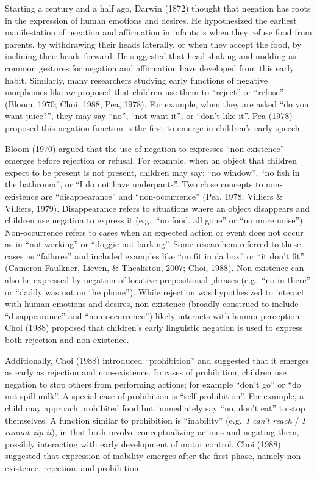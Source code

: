 \documentclass[10pt, letterpaper]{article}
\begin{document}
Starting a century and a half ago, Darwin (1872) thought that negation
has roots in the expression of human emotions and desires. He
hypothesized the earliest manifestation of negation and affirmation in
infants is when they refuse food from parents, by withdrawing their
heads laterally, or when they accept the food, by inclining their heads
forward. He suggested that head shaking and nodding as common gestures
for negation and affirmation have developed from this early habit.
Similarly, many researchers studying early functions of negative
morphemes like \emph{no} proposed that children use them to ``reject''
or ``refuse'' (Bloom, 1970; Choi, 1988; Pea, 1978). For example, when
they are asked ``do you want juice?'', they may say ``no'', ``not want
it'', or ``don't like it''. Pea (1978) proposed this negation function
is the first to emerge in children's early speech.

Bloom (1970) argued that the use of negation to expresses
``non-existence'' emerges before rejection or refusal. For example, when
an object that children expect to be present is not present, children
may say: ``no window'', ``no fish in the bathroom'', or ``I do not have
underpants''. Two close concepts to non-existence are ``disappearance''
and ``non-occurrence'' (Pea, 1978; Villiers \& Villiers, 1979).
Disappearance refers to situations where an object disappears and
children use negation to express it (e.g.~``no food. all gone'' or ``no
more noise''). Non-occurrence refers to cases when an expected action or
event does not occur as in ``not working'' or ``doggie not barking''.
Some researchers referred to these cases as ``failures'' and included
examples like ``no fit in da box'' or ``it don't fit''
(Cameron-Faulkner, Lieven, \& Theakston, 2007; Choi, 1988).
Non-existence can also be expressed by negation of locative
prepositional phrases (e.g.~``no in there'' or ``daddy was not on the
phone''). While rejection was hypothesized to interact with human
emotions and desires, non-existence (broadly construed to include
``disappearance'' and ``non-occurrence'') likely interacts with human
perception. Choi (1988) proposed that children's early linguistic
negation is used to express both rejection and non-existence.

Additionally, Choi (1988) introduced ``prohibition'' and suggested that
it emerges as early as rejection and non-existence. In cases of
prohibition, children use negation to stop others from performing
actions; for example ``don't go'' or ``do not spill milk''. A special
case of prohibition is ``self-prohibition''. For example, a child may
approach prohibited food but immediately say ``no, don't eat'' to stop
themselves. A function similar to prohibition is ``inability''
(e.g.~\emph{I can't reach} / \emph{I cannot zip it}), in that both
involve conceptualizing actions and negating them, possibly interacting
with early development of motor control. Choi (1988) suggested that
expression of inability emerges after the first phase, namely
non-existence, rejection, and prohibition.
\end{document}
